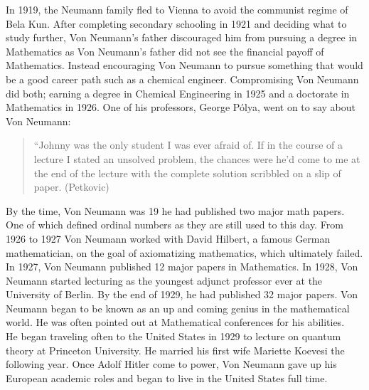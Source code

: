 \documentclass[12pt]{article}
\begin{document}
In 1919, the Neumann family fled to Vienna to avoid the communist regime of Bela Kun. After completing secondary schooling in 1921 and deciding what to study further, Von Neumann's father discouraged him from pursuing a degree in Mathematics as Von Neumann's father did not see the financial payoff of Mathematics. Instead encouraging Von Neumann to pursue something that would be a good career path such as a chemical engineer. Compromising Von Neumann did both; earning a degree in Chemical Engineering in 1925 and a doctorate in Mathematics in 1926. One of his professors, George Pólya, went on to say about Von Neumann:

\begin{quotation}
	``Johnny was the only student I was ever afraid of. If in the course of a lecture I stated an unsolved problem, the chances were he'd come to me at the end of the lecture with the complete solution scribbled on a slip of paper. (Petkovic)
\end{quotation}

By the time, Von Neumann was 19 he had published two major math papers. One of which defined ordinal numbers as they are still used to this day. From 1926 to 1927 Von Neumann worked with David Hilbert, a famous German mathematician, on the goal of axiomatizing mathematics, which ultimately failed. In 1927, Von Neumann published 12 major papers in Mathematics. In 1928, Von Neumann started lecturing as the youngest adjunct professor ever at the University of Berlin. By the end of 1929, he had published 32 major papers. Von Neumann began to be known as an up and coming genius in the mathematical world. He was often pointed out at Mathematical conferences for his abilities. \\
He began traveling often to the United States in 1929 to lecture on quantum theory at Princeton University. He married his first wife Mariette Koevesi the following year. Once Adolf Hitler come to power, Von Neumann gave up his European academic roles and began to live in the United States full time.
\end{document}
